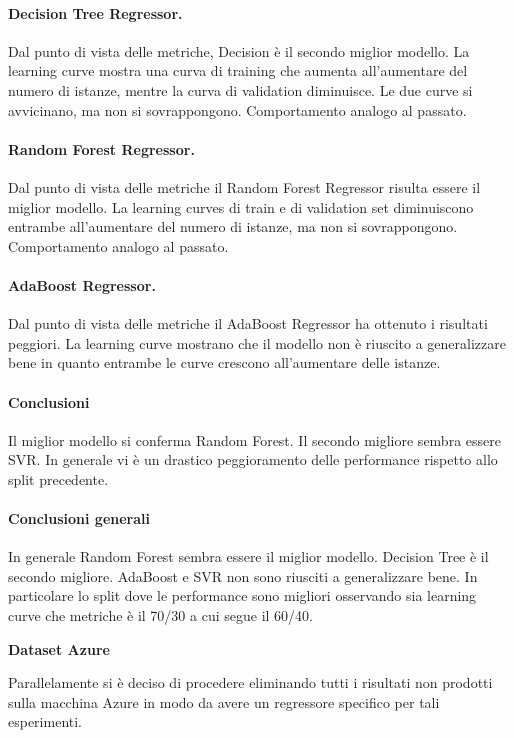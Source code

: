 \paragraph{\textbf{Decision Tree Regressor}.}
Dal punto di vista delle metriche, Decision è il secondo miglior modello.
La learning curve mostra una curva di training che aumenta all'aumentare del numero di istanze, mentre la curva di validation diminuisce. Le due curve si avvicinano, ma non si sovrappongono. Comportamento analogo al passato.
\paragraph{\textbf{Random Forest Regressor}.}
Dal punto di vista delle metriche il Random Forest Regressor risulta essere il miglior modello.
La learning curves di train e di validation set diminuiscono entrambe all'aumentare del numero di istanze, ma non si sovrappongono. Comportamento analogo al passato.
\paragraph{\textbf{AdaBoost Regressor}.}
Dal punto di vista delle metriche il AdaBoost Regressor ha ottenuto i risultati peggiori.
La learning curve mostrano che il modello non è riuscito a generalizzare bene in quanto entrambe le curve crescono all'aumentare delle istanze.


\paragraph{\textbf{Conclusioni}} Il miglior modello si conferma Random Forest. Il secondo migliore sembra essere SVR. In generale vi è un drastico peggioramento delle performance rispetto allo split precedente.



\paragraph{\textbf{Conclusioni generali}} 
In generale Random Forest sembra essere il miglior modello. Decision Tree è il secondo migliore. AdaBoost e SVR non sono riusciti a generalizzare bene. In particolare lo split dove le performance sono migliori osservando sia learning curve che metriche è il 70/30 a cui segue il 60/40.



\noindent \textbf{Dataset Azure}


\noindent Parallelamente si è deciso di procedere eliminando tutti i risultati non prodotti sulla macchina Azure in modo da avere un regressore specifico per tali esperimenti.

